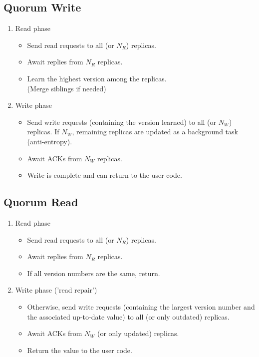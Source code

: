 \subsection{Quorum Write}
\begin{enumerate}
    \item{Read phase}
    \begin{itemize}
        \item Send read requests to all (or $N_{R}$) replicas.
        \item Await replies from $N_{R}$ replicas.
        \item Learn the highest version among the replicas.
       \\
       (Merge siblings if needed)   
    \end{itemize}
    
    \item{Write phase}
    \begin{itemize}
        \item Send write requests (containing the version learned) to all (or $N_{W}$) replicas. If $N_{W}$, remaining replicas are updated as a background task (anti-entropy).
        \item Await ACKs from $N_{W}$ replicas.
        \item Write is complete and can return to the user code.
    \end{itemize}
\end{enumerate}

\subsection{Quorum Read}
\begin{enumerate}
    \item{Read phase}
    \begin{itemize}
        \item Send read requests to all (or $N_{R}$) replicas.
        \item Await replies from $N_{R}$ replicas.
        \item If all version numbers are the same, return.
    \end{itemize}
    
    \item{Write phase ('read repair')}
    \begin{itemize}
        \item Otherwise, send write requests (containing the largest version number and the associated up-to-date value) to all (or only outdated) replicas.
        \item Await ACKs from $N_{W}$ (or only updated) replicas.
        \item Return the value to the user code.
    \end{itemize}
\end{enumerate}

